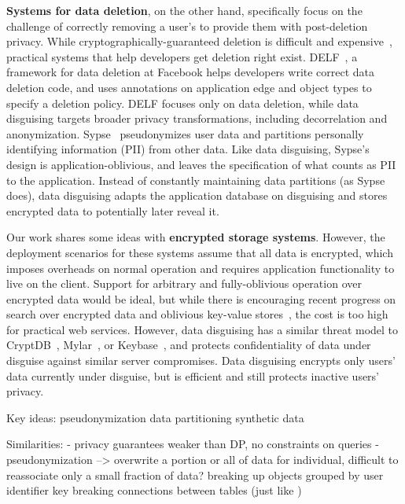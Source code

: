 %
\textbf{Systems for data deletion}, on the other hand, specifically focus on the
challenge of correctly removing a user's to provide them with post-deletion
privacy.
%
While cryptographically-guaranteed deletion is difficult and expensive~\cite{vanish},
practical systems that help developers get deletion right exist.
%
DELF~\cite{delf}, a framework for data deletion at Facebook helps developers write
correct data deletion code, and uses annotations on application edge and object types
to specify a deletion policy.
%
DELF focuses only on data deletion, while data disguising targets broader privacy
transformations, including decorrelation and anonymization.
%
Sypse~\cite{sypse} pseudonymizes user data and partitions personally identifying
information (PII) from other data.
%
Like data disguising, Sypse's design is application-oblivious, and leaves
the specification of what counts as PII to the application.
%
Instead of constantly maintaining data partitions (as Sypse does), data disguising
adapts the application database on disguising and stores encrypted data to
potentially later reveal it.
%

%
Our work shares some ideas with \textbf{encrypted storage systems}.
%
However, the deployment scenarios for these systems assume that all data is
encrypted, which imposes overheads on normal operation and requires application
functionality to live on the client.
%
Support for arbitrary and fully-oblivious operation over encrypted data would
be ideal, but while there is encouraging recent progress on search over encrypted
data and oblivious key-value stores~\cite{dory, snoopy}, the cost is too high for
practical web services.
%
However, data disguising has a similar threat model to CryptDB~\cite{cryptdb},
Mylar~\cite{mylar}, or Keybase~\cite{keybase}, and protects confidentiality of
data under disguise against similar server compromises.
%
Data disguising encrypts only users' data currently under disguise, but is
efficient and still protects inactive users' privacy.
%

%
%



\iffalse
Key ideas:
    pseudonymization
    data partitioning
    synthetic data

Similarities:
- privacy guarantees weaker than DP, no constraints on queries
- pseudonymization --> overwrite a portion or all of data for individual, difficult to reassociate
    only a small fraction of data?
    breaking up objects grouped by user identifier key
    breaking connections between tables (just like )

